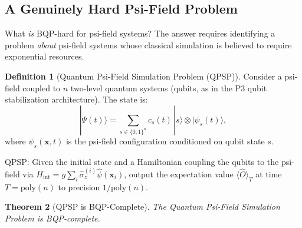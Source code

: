 \documentclass[11pt]{article}
\newtheorem{theorem}{Theorem}[section]
\theoremstyle{definition}
\newtheorem{definition}[theorem]{Definition}
\theoremstyle{remark}
\begin{document}
\subsection{A Genuinely Hard Psi-Field Problem}

What \emph{is} BQP-hard for psi-field systems? The answer requires
identifying a problem \emph{about} psi-field systems whose classical
simulation is believed to require exponential resources.

\begin{definition}[Quantum Psi-Field Simulation Problem (QPSP)]
Consider a psi-field coupled to $n$ two-level quantum systems (qubits, as
in the P3 qubit stabilization architecture). The state is:
\begin{equation}
|\Psi(t)\rangle = \sum_{s \in \{0,1\}^n} c_s(t)\,|s\rangle\otimes|\psi_s(t)\rangle,
\end{equation}
where $\psi_s(\mathbf{x},t)$ is the psi-field configuration conditioned on
qubit state $s$.

\textsc{QPSP}: Given the initial state and a Hamiltonian coupling the
qubits to the psi-field via $H_{\mathrm{int}} = g\sum_i\hat{\sigma}_z^{(i)}\hat{\psi}(\mathbf{x}_i)$,
output the expectation value $\langle\hat{O}\rangle_T$ at time $T = \mathrm{poly}(n)$
to precision $1/\mathrm{poly}(n)$.
\end{definition}

\begin{theorem}[QPSP is BQP-Complete]
\label{thm:qpsp_bqp_complete}
The Quantum Psi-Field Simulation Problem is BQP-complete.
\end{theorem}
\end{document}
